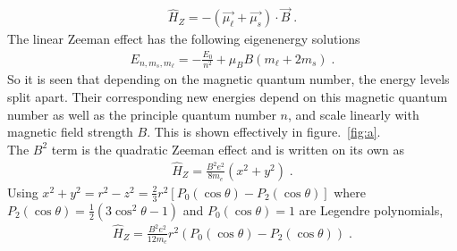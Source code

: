         \begin{align}
            \hat{H}_Z = - \left(\vec{\mu_\ell} + \vec{\mu_s} \right) \cdot \vec{B}\;.
        \end{align}
        \noindent The linear Zeeman effect has the following eigenenergy solutions 
        \begin{align}
            E_{n, m_s, m_\ell} = - \frac{E_0}{n^2} + \mu_B B(m_\ell + 2m_s)\;.
        \end{align}
        \noindent So it is seen that depending on the magnetic quantum number, the energy levels split apart. Their corresponding new energies depend on this magnetic quantum number as well as the principle quantum number $n$, and scale linearly with magnetic field strength $B$. This is shown effectively in figure.~\ref{fig:a}.\\

        \noindent The $B^2$ term is the quadratic Zeeman effect and is written on its own as
        \begin{align}
            \hat{H}_Z = \frac{B^2e^2}{8m_e} (x^2 + y^2)\;.
        \end{align}
        \noindent Using $x^2 + y^2 = r^2 - z^2 = \frac{2}{3}r^2\left[ P_0(\cos \theta) - P_2(\cos \theta)\right]$ where $P_2(\cos \theta) = \frac{1}{2}\left(3\cos^2\theta - 1\right)$ and $P_0(\cos \theta) = 1$ are Legendre polynomials,
        \begin{align}
            \hat{H}_Z = \frac{B^2e^2}{12m_e}r^2 (P_0(\cos \theta) - P_2(\cos \theta))\;.
        \end{align}


